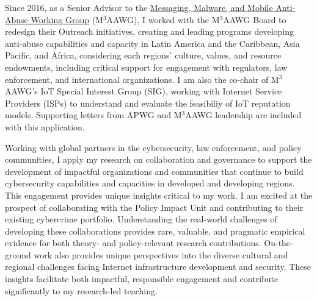 \documentclass[11pt]{letter}
\begin{document}
\begin{letter}
%
Since 2016, as a Senior Advisor to the \href{https://www.m3aawg.org}{Messaging, Malware, and Mobile Anti-Abuse Working Group} (M$^3$AAWG), I worked with the M$^3$AAWG Board to redesign their Outreach initiatives, creating and leading 
programs developing anti-abuse capabilities and capacity in Latin America and the Caribbean, Asia Pacific, and Africa, considering each regions' culture, values, and resource endowments, including critical support for engagement with regulators, law enforcement, and international organizations.
%
I am also the co-chair of M$^3$AAWG's IoT Special Interest Group (SIG), working with Internet Service Providers (ISPs) to understand and evaluate the feasibiliy of IoT reputation models.
%
Supporting letters from APWG and M$^3$AAWG leadership are included with this application.


%
Working with global partners in the cybersecurity, law enforcement, and policy communities, I apply my research on collaboration and governance to support the development of impactful organizations and communities that continue to build cybersecurity capabilities and capacities in developed and developing regions. 
%
This engagement provides unique insights critical to my work.
%
I am excited at the prospect of collaborating with the Policy Impact Unit and contributing to their existing cybercrime portfolio.
%
Understanding the real-world challenges of developing these collaborations provides rare, valuable, and pragmatic empirical evidence for both theory- and policy-relevant research contributions.
%
On-the-ground work also provides unique perspectives into the diverse cultural and regional challenges facing Internet infrastructure development and security.
%
These insights facilitate both impactful, responsible engagement and contribute significantly to my research-led teaching.



\end{letter}
\end{document}
